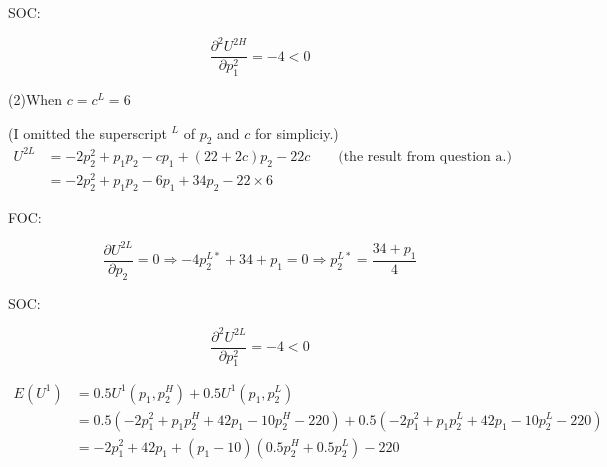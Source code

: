 \documentclass{article}
\begin{document}
SOC:

$$\frac{\partial^2 U^{2H}}{\partial p^2_1} = -4 <0$$



(2)When $c=c^L=6$

(I omitted the superscript $^L$ of $p_2$ and $c$ for simpliciy.)
\begin{align*}
U^{2L} &= -2p_2^2 +p_1p_2 -cp_1 + (22+2c)p_2 -22c \quad \quad \text{(the result from question a.)}  \\
&= -2p_2^2 +p_1p_2 -6p_1 + 34p_2 -22 \times 6
\end{align*}


FOC:

$$\frac{\partial U^{2L}}{\partial p_2} = 0 \Rightarrow -4p^{L*}_2+ 34 + p_1 = 0 \Rightarrow p^{L*}_2 = \frac{34+p_1}{4}$$

SOC:

$$\frac{\partial^2 U^{2L}}{\partial p^2_1} = -4 <0$$





\begin{align*}
E(U^1)&= 0.5 U^1(p_1,p_2^H) + 0.5 U^1(p_1,p_2^L) \\
&= 0.5(-2p_1^2 +p_1p^H_2 + 42p_1 - 10p^H_2 -220) + 0.5(-2p_1^2 +p_1p^L_2 + 42p_1 - 10p^L_2 -220)\\
&=-2p_1^2 + 42p_1 +(p_1 -10)(0.5p^H_2 + 0.5p^L_2) -220
\end{align*}
\end{document}
